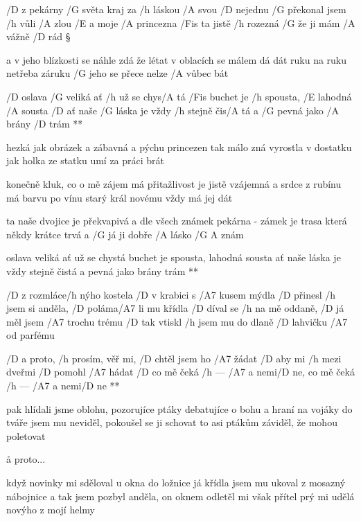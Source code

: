 
/D z pekárny /G světa kraj za /h láskou /A svou
/D nejednu /G překonal jsem /h vůli /A zlou
/E a moje /A princezna /Fis ta jistě /h rozezná
/G že ji mám /A vážně /D rád \S

a v jeho blízkosti se náhle zdá
že létat v oblacích se málem dá
dát ruku na ruku netřeba záruku
/G jeho se přece nelze /A vůbec bát

\R  /D oslava /G veliká ať /h už se chys/A tá
    /Fis buchet je /h spousta, /E lahodná /A sousta
    /D ať naše /G láska je vždy /h stejně čis/A tá
    a /G pevná jako /A brány /D trám **

hezká jak obrázek a zábavná
a pýchu princezen tak málo zná
vyrostla v dostatku jak holka ze statku
umí za práci brát \s

konečně kluk, co o mě zájem má
přitažlivost je jistě vzájemná
a srdce z rubínu má barvu po vínu
starý král novému vždy má jej dát

\R  ta naše dvojice je překvapivá
    a dle všech známek pekárna - zámek
    je trasa která někdy krátce trvá
    a /G já ji dobře /A lásko /{G A} znám \s

    oslava veliká ať už se chystá
    buchet je spousta, lahodná sousta
    ať naše láska je vždy stejně čistá
    a pevná jako brány trám **




/D z rozmláce/h nýho kostela /D v krabici s /A7 kusem mýdla
/D přinesl /h jsem si anděla, /D poláma/A7 li mu křídla
/D díval se /h na mě oddaně, /D já měl jsem /A7 trochu trému
/D tak vtiskl /h jsem mu do dlaně /D lahvičku /A7 od parfému

\R  /D a proto, /h prosím, věř mi, /D chtěl jsem ho /A7 žádat
    /D aby mi /h mezi dveřmi /D pomohl /A7 hádat
    /D co mě čeká /h --- /A7 a nemi/D ne, co mě čeká /h --- /A7 a nemi/D ne **

pak hlídali jsme oblohu, pozorujíce ptáky
debatujíce o bohu  a hraní  na vojáky
do tváře jsem mu neviděl, pokoušel se ji schovat
to asi ptákům záviděl, že mohou poletovat

\r a proto...

když novinky mi sděloval u okna do ložnice
já křídla jsem mu ukoval z mosazný nábojnice
a tak jsem pozbyl anděla, on oknem odletěl mi
však přítel prý mi udělá novýho z mojí helmy

\rr




